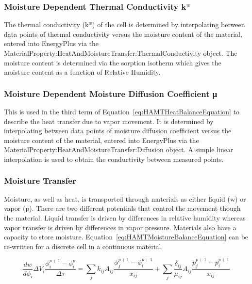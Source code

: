 \subsubsection{Moisture Dependent Thermal Conductivity k\(^{w}\)}\label{moisture-dependent-thermal-conductivity-kw}

The thermal conductivity (k\(^{w}\)) of the cell is determined by interpolating between data points of thermal conductivity versus the moisture content of the material, entered into EnergyPlus via the MaterialProperty:HeatAndMoistureTransfer:ThermalConductivity object. The moisture content is determined via the sorption isotherm which gives the moisture content as a function of Relative Humidity.

\subsubsection{Moisture Dependent Moisture Diffusion Coefficient μ}\label{moisture-dependent-moisture-diffusion-coefficient-ux3bc}

This is used in the third term of Equation~\ref{eq:HAMTHeatBalanceEquation} to describe the heat transfer due to vapor movement. It is determined by interpolating between data points of moisture diffusion coefficient versus the moisture content of the material, entered into EnergyPlus via the MaterialProperty:HeatAndMoistureTransfer:Diffusion object. A simple linear interpolation is used to obtain the conductivity between measured points.

\subsubsection{Moisture Transfer}\label{moisture-transfer}

Moisture, as well as heat, is transported through materials as either liquid (w) or vapor (p). There are two different potentials that control the movement though the material. Liquid transfer is driven by differences in relative humidity whereas vapor transfer is driven by differences in vapor pressure. Materials also have a capacity to store moisture. Equation~\ref{eq:HAMTMoistureBalanceEquation} can be re-written for a discrete cell in a continuous material.

\begin{equation}
\frac{{dw}}{{d{\phi_i}}}\Delta {V_i}\frac{{\phi_i^{p + 1} - \phi_i^p}}{{\Delta \tau }} = \sum\limits_j {{k_{ij}}{A_{ij}}\frac{{\phi_j^{p + 1} - \phi_i^{p + 1}}}{{{x_{ij}}}}}  + \sum\limits_j {\frac{{{\delta_{ij}}}}{{{\mu_{ij}}}}{A_{ij}}\frac{{p_j^{p + 1} - p_i^{p + 1}}}{{{x_{ij}}}}}
\label{eq:HAMTMoistureBalanceEquationDiscreteCell}
\end{equation}

